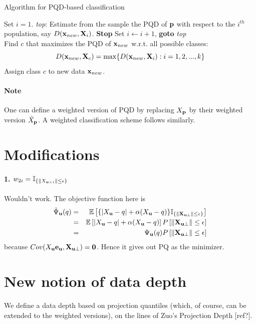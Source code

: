 \documentclass{article}
\begin{document}
\begin{algorithm}[h]
\caption{Algorithm for PQD-based classification}
\begin{algorithmic}[1]
\State Set $i=1$.
\State \emph{top}:
\State Estimate from the sample the PQD of ${\bf{p}}$ with respect to the $i^{th}$ population, say $D({\bf{x}}_{new},{\mathbf{X}}_i)$.
 \textbf{Stop}
	\Else \State Set $i\leftarrow i+1$, \textbf{goto} \emph{top}
\EndIf
\\
\State Find $c$ that maximizes the PQD of ${\bf{x}}_{new}$ w.r.t. all possible classes:
$$ D({\bf{x}}_{new},{\mathbf{X}}_c) = \max\{D({\bf{x}}_{new},{\mathbf{X}}_i): i=1,2,...,k\} $$
\State Assign class $c$ to new data ${\bf{x}}_{new}$.

\EndProcedure
\end{algorithmic}
\end{algorithm}

\paragraph{Note} One can define a weighted version of PQD by replacing $X_{\bf{p}}$ by their weighted version $\tilde X_{\bf{p}}$. A weighted classification scheme follows similarly.

\section*{Modifications}
\paragraph{1. $w_{2i}=\mathbb{I}_{\{\|X_{{\bf{u}}\perp i}\|\leq\epsilon\}}$}
Wouldn't work. The objective function here is
\begin{eqnarray*}
\tilde\Psi_{\bf{u}}(q) &=& \mathbb{E}\left[\lbrace |X_{\bf{u}}-q|+\alpha(X_{\bf{u}}-q)\rbrace\mathbb{I}_{\{\|{\mathbf{X}}_{{\bf{u}}\perp}\|\leq\epsilon\}}\right]\\
&=&\mathbb{E}\left[|X_{\bf{u}}-q|+\alpha(X_{\bf{u}}-q)\right]P\left[\|{\mathbf{X}}_{{\bf{u}}\perp}\|\leq\epsilon\right]\\
&=&\Psi_{\bf{u}}(q)P\left[\|{\mathbf{X}}_{{\bf{u}}\perp}\|\leq\epsilon\right]
\end{eqnarray*}
because $Cov(X_{\bf{u}}{\bf{e}}_{\bf{u}},{\mathbf{X}}_{{\bf{u}}\perp})=\bf{0}$. Hence it gives out PQ as the minimizer.

\section*{New notion of data depth}We define a data depth based on projection quantiles (which, of course, can be extended to the weighted versions), on the lines of Zuo's Projection Depth [ref?].
\end{document}
